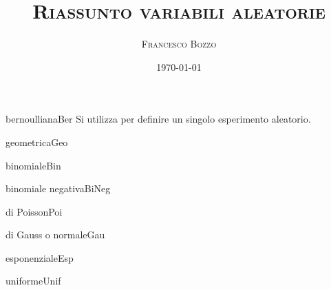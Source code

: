 \documentclass[
	,a4paper
	,12pt
	,oneside
]{article}
\title{\textsc{Riassunto variabili aleatorie}}
\author{\textsc{Francesco Bozzo}}
\date{\today}
\begin{document}
\maketitle

\begin{aleatoria}{bernoulliana}{Ber}
	Si utilizza per definire un singolo esperimento aleatorio.
\end{aleatoria}

\begin{aleatoria}{geometrica}{Geo}
\end{aleatoria}

\begin{aleatoria}{binomiale}{Bin}

\end{aleatoria}

\begin{aleatoria}{binomiale negativa}{BiNeg}
\end{aleatoria}

\begin{aleatoria}{di Poisson}{Poi}
\end{aleatoria}

\begin{aleatoria}{di Gauss o normale}{Gau}
\end{aleatoria}

\begin{aleatoria}{esponenziale}{Esp}
\end{aleatoria}

\begin{aleatoria}{uniforme}{Unif}
\end{aleatoria}
\end{document}
